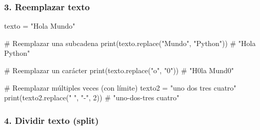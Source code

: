 \documentclass[
  doc,
  floatsintext,
  longtable,
  a4paper,
  nolmodern,
  notxfonts,
  notimes,
  12pt,
  colorlinks=true,linkcolor=blue,citecolor=blue,urlcolor=blue]{apa7}
\newenvironment{Shaded}{\begin{snugshade}}{\end{snugshade}}
\newcommand{\BuiltInTok}[1]{\textcolor[rgb]{0.00,0.23,0.31}{#1}}
\newcommand{\CommentTok}[1]{\textcolor[rgb]{0.37,0.37,0.37}{#1}}
\newcommand{\DecValTok}[1]{\textcolor[rgb]{0.68,0.00,0.00}{#1}}
\newcommand{\NormalTok}[1]{\textcolor[rgb]{0.00,0.23,0.31}{#1}}
\newcommand{\OperatorTok}[1]{\textcolor[rgb]{0.37,0.37,0.37}{#1}}
\newcommand{\StringTok}[1]{\textcolor[rgb]{0.13,0.47,0.30}{#1}}
\begin{document}
\subsubsection{3. Reemplazar texto}\label{reemplazar-texto}

\begin{Shaded}
\begin{Highlighting}[]
\NormalTok{texto }\OperatorTok{=} \StringTok{"Hola Mundo"}

\CommentTok{\# Reemplazar una subcadena}
\BuiltInTok{print}\NormalTok{(texto.replace(}\StringTok{"Mundo"}\NormalTok{, }\StringTok{"Python"}\NormalTok{))  }\CommentTok{\# "Hola Python"}

\CommentTok{\# Reemplazar un carácter}
\BuiltInTok{print}\NormalTok{(texto.replace(}\StringTok{"o"}\NormalTok{, }\StringTok{"0"}\NormalTok{))  }\CommentTok{\# "H0la Mund0"}

\CommentTok{\# Reemplazar múltiples veces (con límite)}
\NormalTok{texto2 }\OperatorTok{=} \StringTok{"uno dos tres cuatro"}
\BuiltInTok{print}\NormalTok{(texto2.replace(}\StringTok{" "}\NormalTok{, }\StringTok{"{-}"}\NormalTok{, }\DecValTok{2}\NormalTok{))  }\CommentTok{\# "uno{-}dos{-}tres cuatro"}
\end{Highlighting}
\end{Shaded}

\subsubsection{4. Dividir texto (split)}\label{dividir-texto-split}
\end{document}
